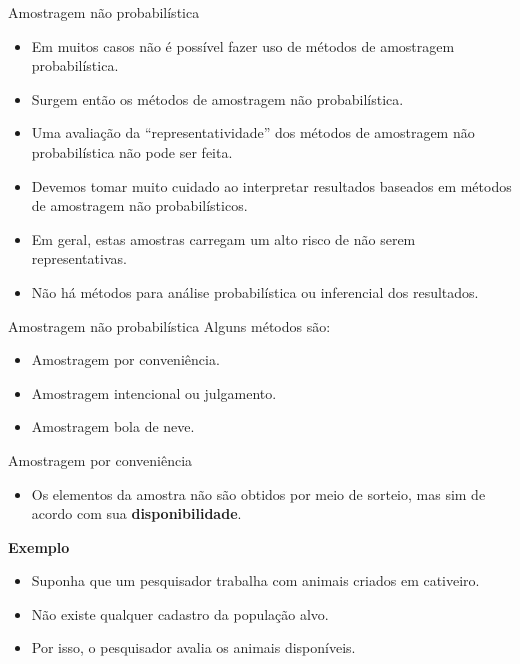 \documentclass[
  ignorenonframetext,
  serif,
  professionalfont,
  usenames,
  dvipsnames,
  aspectratio = 169]{beamer}
\providecommand{\tightlist}{%
  \setlength{\itemsep}{0pt}\setlength{\parskip}{0pt}}
\renewcommand{\tightlist}{%
  \setlength{\itemsep}{0\baselineskip}
  \setlength{\parskip}{0.25\baselineskip}
}
\begin{document}
\begin{frame}{Amostragem não probabilística}
\protect\hypertarget{amostragem-nuxe3o-probabiluxedstica-1}{}
\begin{itemize}
\item
  Em muitos casos não é possível fazer uso de métodos de amostragem
  probabilística.
\item
  Surgem então os métodos de amostragem não probabilística.
\item
  Uma avaliação da ``representatividade'' dos métodos de amostragem não
  probabilística não pode ser feita.
\item
  Devemos tomar muito cuidado ao interpretar resultados baseados em
  métodos de amostragem não probabilísticos.
\item
  Em geral, estas amostras carregam um alto risco de não serem
  representativas.
\item
  Não há métodos para análise probabilística ou inferencial dos
  resultados.
\end{itemize}
\end{frame}

\begin{frame}{Amostragem não probabilística}
\protect\hypertarget{amostragem-nuxe3o-probabiluxedstica-2}{}
Alguns métodos são:

\begin{itemize}
\tightlist
\item
  Amostragem por conveniência.
\item
  Amostragem intencional ou julgamento.
\item
  Amostragem bola de neve.
\end{itemize}
\end{frame}

\begin{frame}{Amostragem por conveniência}
\protect\hypertarget{amostragem-por-conveniuxeancia}{}
\begin{itemize}
\tightlist
\item
  Os elementos da amostra não são obtidos por meio de sorteio, mas sim
  de acordo com sua \textbf{disponibilidade}.
\end{itemize}

\textbf{Exemplo}

\begin{itemize}
\item
  Suponha que um pesquisador trabalha com animais criados em cativeiro.
\item
  Não existe qualquer cadastro da população alvo.
\item
  Por isso, o pesquisador avalia os animais disponíveis.
\end{itemize}
\end{frame}
\end{document}
